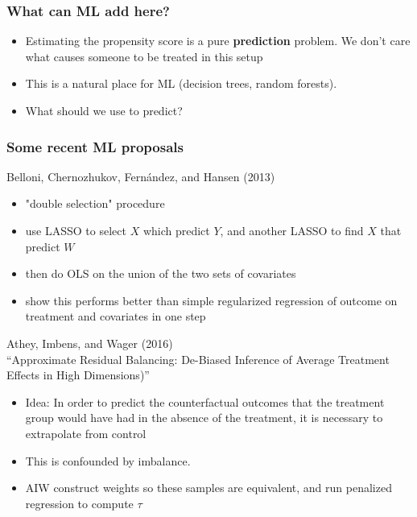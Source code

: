\begin{frame}
  \frametitle{What can ML add here?}
  \begin{itemize}
  \item Estimating the propensity score is a pure \textbf{prediction} problem. We don't care what causes someone to be treated in this setup
  \item This is a natural place for ML (decision trees, random forests). 
  \item What should we use to predict? 
  \end{itemize}
\end{frame}

\begin{frame}[allowframebreaks]
  \frametitle{Some recent ML proposals}
  Belloni, Chernozhukov, Fernández, and Hansen (2013) \nocite{belloni2015program}
  \begin{itemize}
    \item "double selection" procedure
    \item use LASSO to select $X$ which predict $Y$, and another LASSO to find $X$ that predict $W$ 
    \item then do OLS on the union of the two sets of covariates
    \item show this performs better than simple regularized regression of outcome on treatment and covariates in one step 
  \end{itemize}
  
  \framebreak

  Athey, Imbens, and Wager (2016) \nocite{athey2016efficient} \\
  ``Approximate Residual Balancing: De-Biased Inference of Average Treatment Effects in High Dimensions)''
  \begin{itemize}
    \item Idea: In order to predict the counterfactual outcomes that the treatment
    group would have had in the absence of the treatment, it is necessary to extrapolate from control
    \item This is confounded by imbalance. 
    \item AIW construct weights so these samples are equivalent, and run penalized regression to compute $\tau$ 
  \end{itemize}

\end{frame}

